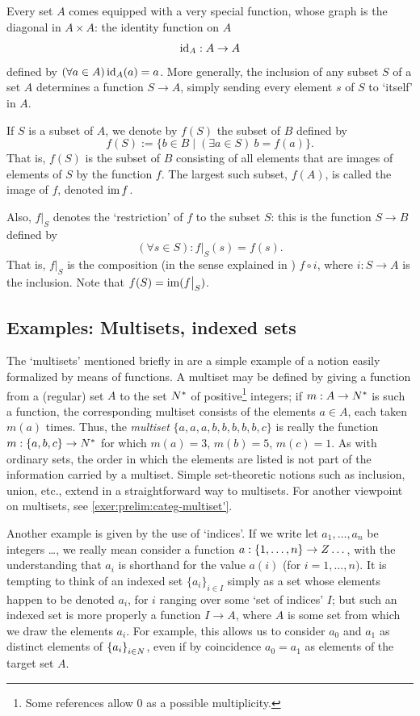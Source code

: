 Every set $A$ comes equipped with a very special function, whose graph
is the diagonal in $A \times A$: the identity function on $A$
\[\operatorname{id}_A : A \to A\]
defined by $(\forall a \in A) \operatorname{id}_A(a) = a$. More generally, the
inclusion of any subset $S$ of a set $A$ determines a function
$S \to A$, simply sending every element $s$ of $S$ to `itself' in $A$.

If $S$ is a subset of $A$, we denote by $f (S)$ the subset of $B$
defined by
\[f(S) := \{b \in B \mid (\exists a \in S)\ b = f(a)\}.\] That is,
$f(S)$ is the subset of $B$ consisting of all elements that are images
of elements of $S$ by the function $f$. The largest such subset,
$f(A)$, is called the image of $f$, denoted $\operatorname{im} f$.

Also, $f\big|_S$ denotes the `restriction' of $f$ to the subset $S$:
this is the function $S \to B$ defined by
\[(\forall s \in S) : f\big|_S (s) = f (s).\] That is, $f\big|_S$ is
the composition (in the sense explained in
) $f \circ i$, where
$i : S \to A$ is the inclusion. Note that $f (S) = \operatorname{im}(f\big|_S)$.


\subsection{Examples: Multisets, indexed sets}%
\label{subsec:prelims:examples-multisets-indexed-sets}
The `multisets' mentioned briefly in  are a
simple example of a notion easily formalized by means of functions.  A
multiset may be defined by giving a function from a (regular) set $A$
to the set $N^*$ of positive\footnote{Some references allow 0 as a
  possible multiplicity.} integers; if $m : A \to N^*$ is such a
function, the corresponding multiset consists of the elements
$a \in A$, each taken $m(a)$ times. Thus, the \emph{multiset}
$\{a, a, a, b, b, b, b, b, c\}$ is really the function
$m : \{a, b, c\} \to N^*$ for which $m(a) = 3$, $m(b) = 5$,
$m(c) = 1$. As with ordinary sets, the order in which the elements are
listed is not part of the information carried by a multiset. Simple
set-theoretic notions such as inclusion, union, etc., extend in a
straightforward way to multisets.  For another viewpoint on multisets,
see \cref{exer:prelim:categ-multiset'}.

Another example is given by the use of `indices'. If we write let
$a_1,\dots ,a_n$ be integers \dots, we really mean consider a function
$a : \{1,\dots , n\} \to Z\dots$, with the understanding that $a_i$
is shorthand for the value $a(i)$ (for $i = 1, \dots,n)$. It is
tempting to think of an indexed set ${\{a_i\}}_{i\in I}$ simply as a
set whose elements happen to be denoted $a_i$, for $i$ ranging over
some `set of indices' $I$; but such an indexed set is more properly a
function $I \to A$, where $A$ is some set from which we draw the
elements $a_i$. For example, this allows us to consider $a_0$ and
$a_1$ as distinct elements of ${\{a_i\}}_{i\in N}$, even if by
coincidence $a_0 = a_1$ as elements of the target set $A$.

